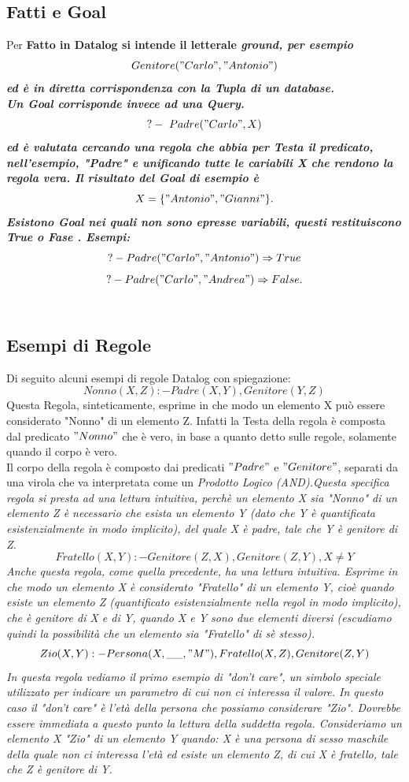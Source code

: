 \documentclass[11pt]{article} %
\begin{document}
\subsection{Fatti e Goal}
Per \bf Fatto \rm in Datalog si intende il letterale \it ground\rm, per esempio $$ Genitore("Carlo","Antonio") $$ ed è in diretta corrispondenza con la \bf Tupla \rm di un database. \\
Un \bf Goal \rm corrisponde invece ad una Query. $$ ?-\ Padre("Carlo", X) $$ ed è valutata cercando una regola che abbia per Testa il predicato, nell'esempio, "Padre" e unificando tutte le cariabili X che rendono la regola vera. Il risultato del Goal di esempio è $$ X = \{ "Antonio", "Gianni" \}.$$ Esistono Goal nei quali non sono epresse variabili, questi restituiscono \it True o Fase \rm. Esempi: $$ ? - Padre("Carlo","Antonio") \Rightarrow True $$ $$ ? - Padre("Carlo","Andrea") \Rightarrow False. $$ \\
\subsection{Esempi di Regole}
Di seguito alcuni esempi di regole Datalog con spiegazione:
$$ Nonno(X,Z) :- Padre(X,Y), Genitore(Y,Z) $$
Questa Regola, sinteticamente, esprime in che modo un elemento X può essere considerato "Nonno" di un elemento Z. Infatti la Testa della regola è composta dal predicato $"Nonno"$ che è vero, in base a quanto detto sulle regole, solamente quando il corpo è vero.\\
Il corpo della regola è composto dai predicati $"Padre"$ e $"Genitore"$, separati da una virola che va interpretata come un \it Prodotto Logico (AND).\rm Questa specifica regola si presta ad una lettura intuitiva, perchè un elemento X sia "Nonno" di un elemento Z è necessario che esista un elemento Y (dato che Y è quantificata esistenzialmente in modo implicito), del quale X è padre, tale che Y è genitore di Z.\\
$$Fratello(X,Y) :- Genitore(Z,X), Genitore(Z,Y), X \not = Y$$
Anche questa regola, come quella precedente, ha una lettura intuitiva. Esprime in che modo un elemento X è considerato "Fratello" di un elemento Y, cioè quando esiste un elemento Z (quantificato esistenzialmente nella regol in modo implicito), che è genitore di X e di Y, quando X e Y sono due elementi diversi (escudiamo quindi la possibilità che un elemento sia "Fratello" di sè stesso).\\
$$Zio(X,Y) :- Persona(X,\_\_,"M"), Fratello(X,Z), Genitore(Z,Y)$$
In questa regola vediamo il primo esempio di "don't care", un simbolo speciale utilizzato per indicare un parametro di cui non ci interessa il valore. In questo caso il "don't care" è l'età della persona che possiamo considerare "Zio". Dovrebbe essere immediata a questo punto la lettura della suddetta regola. Consideriamo un elemento X "Zio" di un elemento Y quando: X è una persona di sesso maschile della quale non ci interessa l'età ed esiste un elemento Z, di cui X è fratello, tale che Z è genitore di Y.
\end{document}
